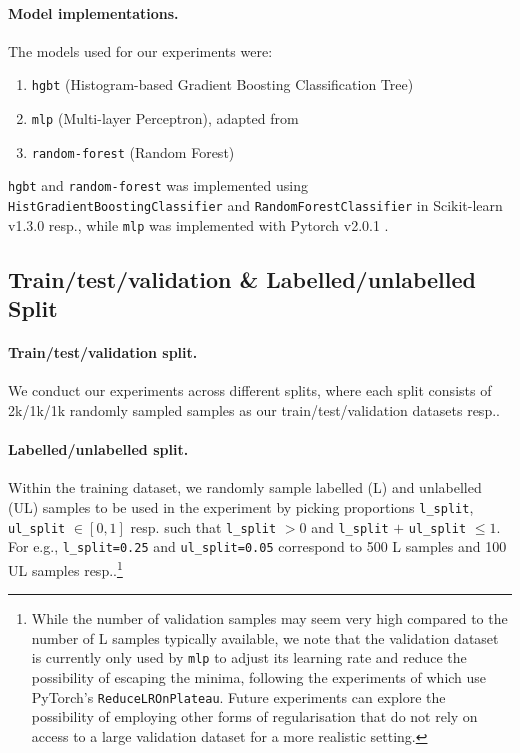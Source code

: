 \documentclass{article}
\begin{document}
\clearpage
\paragraph{Model implementations.}
The models used for our experiments were: \begin{enumerate}
  \item \texttt{hgbt} (Histogram-based Gradient Boosting Classification Tree)
  \item \texttt{mlp} (Multi-layer Perceptron), adapted from
  \cite{gorishniy2021revisiting}
  \item \texttt{random-forest} (Random Forest)
\end{enumerate}
\texttt{hgbt} and \texttt{random-forest} was implemented using
\texttt{HistGradientBoostingClassifier} and \texttt{RandomForestClassifier} in
Scikit-learn v1.3.0 \cite{pedregosa2011scikitlearn} resp., while \texttt{mlp} was
implemented with Pytorch v2.0.1 \cite{paszke2019pytorch}.

\subsection{Train/test/validation \& Labelled/unlabelled Split}

\paragraph{Train/test/validation split.}
We conduct our experiments across different splits, where each split consists of
2k/1k/1k randomly sampled samples as our train/test/validation datasets resp..

\paragraph{Labelled/unlabelled split.}
Within the training dataset, we randomly sample labelled (L) and unlabelled (UL) samples
to be used in the experiment by picking proportions \texttt{l\_split},
\texttt{ul\_split} $\in [0, 1]$ resp. such that \texttt{l\_split} $> 0$ and
\texttt{l\_split} $+$ \texttt{ul\_split} $\leq 1$.
For e.g., \texttt{l\_split=0.25} and \texttt{ul\_split=0.05} correspond to 500 L samples
and 100 UL samples resp..\footnote{%
  While the number of validation samples may seem very high compared to the number of L
  samples typically available, we note that the validation dataset is currently only
  used by \texttt{mlp} to adjust its learning rate and reduce the possibility of
  escaping the minima, following the experiments of \cite{grinsztajn2022why} which use
  PyTorch's \texttt{ReduceLROnPlateau}.
  Future experiments can explore the possibility of employing other forms of
  regularisation that do not rely on access to a large validation dataset for a more
  realistic setting.
}
\end{document}
